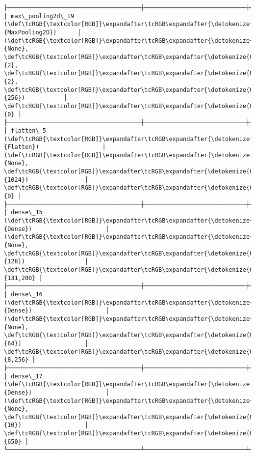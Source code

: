 \documentclass[11pt]{article}
\begin{document}
\begin{Verbatim}[commandchars=\\\{\}]
├──────────────────────────────────────┼─────────────────────────────┼─────────────────┤
│ max\_pooling2d\_19 (\def\tcRGB{\textcolor[RGB]}\expandafter\tcRGB\expandafter{\detokenize{0,135,255}}{MaxPooling2D})      │ (\def\tcRGB{\textcolor[RGB]}\expandafter\tcRGB\expandafter{\detokenize{0,215,255}}{None}, \def\tcRGB{\textcolor[RGB]}\expandafter\tcRGB\expandafter{\detokenize{0,175,0}}{2}, \def\tcRGB{\textcolor[RGB]}\expandafter\tcRGB\expandafter{\detokenize{0,175,0}}{2}, \def\tcRGB{\textcolor[RGB]}\expandafter\tcRGB\expandafter{\detokenize{0,175,0}}{256})           │               \def\tcRGB{\textcolor[RGB]}\expandafter\tcRGB\expandafter{\detokenize{0,175,0}}{0} │
├──────────────────────────────────────┼─────────────────────────────┼─────────────────┤
│ flatten\_5 (\def\tcRGB{\textcolor[RGB]}\expandafter\tcRGB\expandafter{\detokenize{0,135,255}}{Flatten})                  │ (\def\tcRGB{\textcolor[RGB]}\expandafter\tcRGB\expandafter{\detokenize{0,215,255}}{None}, \def\tcRGB{\textcolor[RGB]}\expandafter\tcRGB\expandafter{\detokenize{0,175,0}}{1024})                │               \def\tcRGB{\textcolor[RGB]}\expandafter\tcRGB\expandafter{\detokenize{0,175,0}}{0} │
├──────────────────────────────────────┼─────────────────────────────┼─────────────────┤
│ dense\_15 (\def\tcRGB{\textcolor[RGB]}\expandafter\tcRGB\expandafter{\detokenize{0,135,255}}{Dense})                     │ (\def\tcRGB{\textcolor[RGB]}\expandafter\tcRGB\expandafter{\detokenize{0,215,255}}{None}, \def\tcRGB{\textcolor[RGB]}\expandafter\tcRGB\expandafter{\detokenize{0,175,0}}{128})                 │         \def\tcRGB{\textcolor[RGB]}\expandafter\tcRGB\expandafter{\detokenize{0,175,0}}{131,200} │
├──────────────────────────────────────┼─────────────────────────────┼─────────────────┤
│ dense\_16 (\def\tcRGB{\textcolor[RGB]}\expandafter\tcRGB\expandafter{\detokenize{0,135,255}}{Dense})                     │ (\def\tcRGB{\textcolor[RGB]}\expandafter\tcRGB\expandafter{\detokenize{0,215,255}}{None}, \def\tcRGB{\textcolor[RGB]}\expandafter\tcRGB\expandafter{\detokenize{0,175,0}}{64})                  │           \def\tcRGB{\textcolor[RGB]}\expandafter\tcRGB\expandafter{\detokenize{0,175,0}}{8,256} │
├──────────────────────────────────────┼─────────────────────────────┼─────────────────┤
│ dense\_17 (\def\tcRGB{\textcolor[RGB]}\expandafter\tcRGB\expandafter{\detokenize{0,135,255}}{Dense})                     │ (\def\tcRGB{\textcolor[RGB]}\expandafter\tcRGB\expandafter{\detokenize{0,215,255}}{None}, \def\tcRGB{\textcolor[RGB]}\expandafter\tcRGB\expandafter{\detokenize{0,175,0}}{10})                  │             \def\tcRGB{\textcolor[RGB]}\expandafter\tcRGB\expandafter{\detokenize{0,175,0}}{650} │
└──────────────────────────────────────┴─────────────────────────────┴─────────────────┘

    \end{Verbatim}
\end{document}
